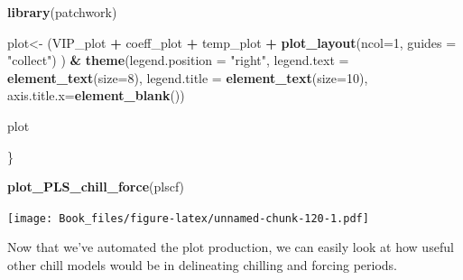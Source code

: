 \documentclass[
]{book}
\newenvironment{Shaded}{\begin{snugshade}}{\end{snugshade}}
\newcommand{\DataTypeTok}[1]{\textcolor[rgb]{0.13,0.29,0.53}{#1}}
\newcommand{\DecValTok}[1]{\textcolor[rgb]{0.00,0.00,0.81}{#1}}
\newcommand{\KeywordTok}[1]{\textcolor[rgb]{0.13,0.29,0.53}{\textbf{#1}}}
\newcommand{\NormalTok}[1]{#1}
\newcommand{\OperatorTok}[1]{\textcolor[rgb]{0.81,0.36,0.00}{\textbf{#1}}}
\newcommand{\StringTok}[1]{\textcolor[rgb]{0.31,0.60,0.02}{#1}}
\begin{document}
\begin{Shaded}
\begin{Highlighting}[]
  \KeywordTok{library}\NormalTok{(patchwork)}
  
\NormalTok{  plot<-}\StringTok{ }\NormalTok{(VIP_plot }\OperatorTok{+}
\StringTok{            }\NormalTok{coeff_plot }\OperatorTok{+}
\StringTok{            }\NormalTok{temp_plot }\OperatorTok{+}
\StringTok{            }\KeywordTok{plot_layout}\NormalTok{(}\DataTypeTok{ncol=}\DecValTok{1}\NormalTok{,}
                        \DataTypeTok{guides =} \StringTok{"collect"}\NormalTok{)}
\NormalTok{          ) }\OperatorTok{&}\StringTok{ }\KeywordTok{theme}\NormalTok{(}\DataTypeTok{legend.position =} \StringTok{"right"}\NormalTok{,}
                    \DataTypeTok{legend.text =} \KeywordTok{element_text}\NormalTok{(}\DataTypeTok{size=}\DecValTok{8}\NormalTok{),}
                    \DataTypeTok{legend.title =} \KeywordTok{element_text}\NormalTok{(}\DataTypeTok{size=}\DecValTok{10}\NormalTok{),}
                    \DataTypeTok{axis.title.x=}\KeywordTok{element_blank}\NormalTok{())}

\NormalTok{plot}

\NormalTok{\}}

\KeywordTok{plot_PLS_chill_force}\NormalTok{(plscf)}
\end{Highlighting}
\end{Shaded}

\texttt{[image: Book\_files/figure-latex/unnamed-chunk-120-1.pdf]}

Now that we've automated the plot production, we can easily look at how useful other chill models would be in delineating chilling and forcing periods.
\end{document}
